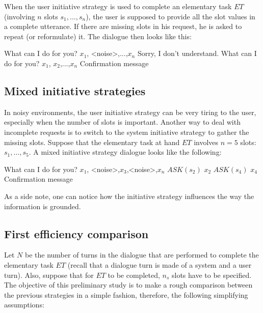 		When the user initiative strategy is used to complete an elementary task $ET$ (involving $n$ slots $s_1,...,s_n$), the user is supposed to provide all the slot values in a complete utterance. If there are missing slots in his request, he is asked to repeat (or reformulate) it. The dialogue then looks like this:
		
		\begin{dialogue}
			 What can I do for you?
			 $x_1$, <noise>,...,$x_n$
			 Sorry, I don't understand. What can I do for you?
			 $x_1$, $x_2$,...,$x_n$
			 Confirmation message
		\end{dialogue}
	
	\subsection{Mixed initiative strategies}
	
		In noisy environments, the user initiative strategy can be very tiring to the user, especially when the number of slots is important. Another way to deal with incomplete requests is to switch to the system initiative strategy to gather the missing slots. Suppose that the elementary task at hand $ET$ involves $n=5$ slots: $s_1,...,s_5$. A mixed initiative strategy dialogue looks like the following:
		
		\begin{dialogue}
			 What can I do for you?
			 $x_1$, <noise>,$x_3$,<noise>,$x_n$
			 $ASK(s_2)$
			\speak{USER} $x_2$
			 $ASK(s_4)$
			\speak{USER} $x_4$
			 Confirmation message
		\end{dialogue}

                As a side note, one can notice how the initiative strategy influences the way the information is grounded.
	
	\subsection{First efficiency comparison}
	
		Let $N$ be the number of turns in the dialogue that are performed to complete the elementary task $ET$ (recall that a dialogue turn is made of a system and a user turn). Also, suppose that for $ET$ to be completed, $n_s$ slots have to be specified. The objective of this preliminary study is to make a rough comparison between the previous strategies in a simple fashion, therefore, the following simplifying assumptions:
		
